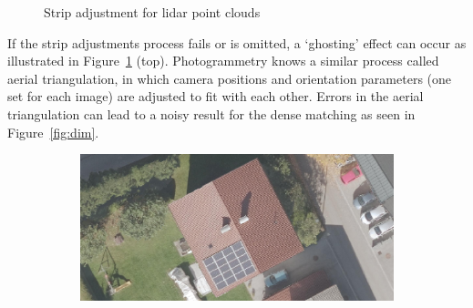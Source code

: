 \begin{figure}
\begin{subfigure}{0.4\linewidth}
		\label{fig:lidarGableRoof}
	\end{subfigure}
	\caption{Strip adjustment for lidar point clouds}%
\label{fig:lidarStripAdj}
\end{figure}
If the strip adjustments process fails or is omitted, a `ghosting' effect can occur as illustrated in Figure~\ref{fig:lidarGableRoof} (top). 
Photogrammetry knows a similar process called aerial triangulation, in which camera positions and orientation parameters (one set for each image) are adjusted to fit with each other. Errors in the aerial triangulation can lead to a noisy result for the dense matching as seen in Figure~\ref{fig:dim}.
\begin{figure}
	\centering
	\begin{subfigure}{0.45\linewidth}
		\includegraphics[width=\textwidth]{figs/Roof_OP_NA_10cm.jpg}
		\label{fig:dim:a}
	\end{subfigure}
	

\end{figure}
